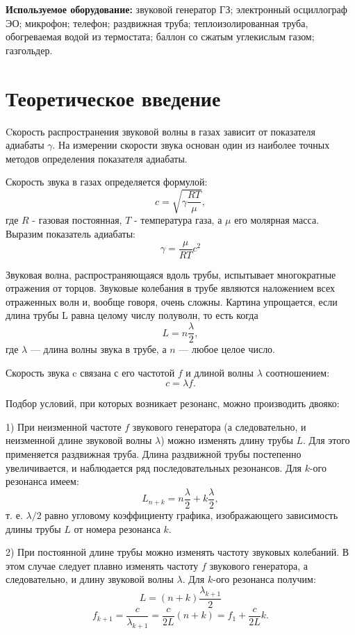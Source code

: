 \documentclass[a4paper, 12pt]{article} %
\begin{document}
\textbf{Используемое оборудование:} звуковой генератор ГЗ; электронный
    осциллограф ЭО; микрофон; телефон; раздвижная труба; теплоизолированная труба, обогреваемая водой из термостата; баллон
    со сжатым углекислым газом; газгольдер.
                    
\section{Теоретическое введение}

Cкорость распространения звуковой волны в газах зависит от показателя адиабаты $\gamma$. На измерении скорости звука основан один из наиболее  точных методов определения показателя  адиабаты.
        
        Скорость звука в газах определяется формулой:
        $$c=\sqrt{\gamma\frac{RT}{\mu}},$$
        где $R$ - газовая постоянная, $T$ - температура газа, а $\mu$ его молярная масса. Выразим показатель адиабаты:
        $$\gamma=\frac{\mu}{RT} c^2$$
        
        Звуковая волна, распространяющаяся вдоль трубы, испытывает многократные отражения от торцов. Звуковые колебания в трубе являются наложением всех отраженных волн и, вообще говоря, очень сложны. Картина упрощается, если длина трубы L равна целому числу полуволн, то есть когда
        $$L=n\frac{\lambda}{2},$$
        где $\lambda$ — длина волны звука в трубе, а $n$ — любое целое число.
        
        Скорость звука c связана с его частотой $f$ и длиной волны $\lambda$ соотношением:
        $$c=\lambda f.$$
        
        Подбор условий, при которых возникает резонанс, можно производить двояко:
        
        1) При неизменной частоте $f$ звукового генератора (а следовательно, и неизменной длине звуковой волны $\lambda$) можно изменять длину трубы $L$. Для этого применяется раздвижная труба. Длина раздвижной трубы постепенно увеличивается, и наблюдается ряд последовательных резонансов. Для $k$-ого резонанса имеем:
        $$L_{n+k}=n\frac{\lambda}{2} + k\frac{\lambda}{2},$$
        т. е. $\lambda/2$ равно угловому коэффициенту графика, изображающего зависимость длины трубы $L$ от номера резонанса $k$.
        
        2) При постоянной длине трубы можно изменять частоту звуковых
        колебаний. В этом случае следует плавно изменять частоту $f$ звукового генератора, а следовательно, и длину звуковой волны $\lambda$.
        Для $k$-ого резонанса получим:
        $$L = (n+k)\frac{\lambda_{k+1}}{2}$$
        $$f_{k+1} = \frac{c}{\lambda_{k+1}}=\frac{c}{2L}(n+k)=f_1 + \frac{c}{2L}k.$$
        
\end{document}
